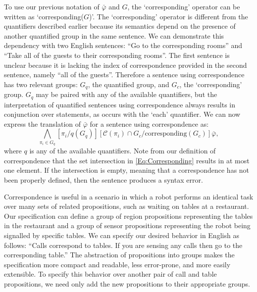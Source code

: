 To use our previous notation of $\bar{\varphi}$ and $G$, the `corresponding' operator can be written as `corresponding($G$)'. 
The `corresponding' operator is different from the quantifiers described earlier because its semantics depend on the presence of another quantified group in the same sentence. 
We can demonstrate this dependency with two English sentences: ``Go to the corresponding rooms'' and ``Take all of the guests to their corresponding rooms''.
The first sentence is unclear because it is lacking the index of correspondence provided in the second sentence, namely ``all of the guests''. 
Therefore a sentence using correspondence has two relevant groups: $G_q$, the quantified group, and $G_c$, the `corresponding' group. 
$G_q$ may be paired with any of the available quantifiers, but the interpretation of quantified sentences using correspondence always results in conjunction over statements, as occurs with the `each' quantifier. 
We can now express the translation of $\bar{\varphi}$ for a sentence using correspondence as:
\begin{equation}\label{Eq:Corresponding}
	\bigwedge \limits_{\pi_i \in G_q} [\pi_i / q(G_q)] [\mathcal{C}(\pi_i) \cap G_c / \text{corresponding}(G_c)] \bar{\varphi},
\end{equation}
where $q$ is any of the available quantifiers. 
Note from our definition of correspondence that the set intersection in \eqref{Eq:Corresponding} results in at most one element. 
If the intersection is empty, meaning that a correspondence has not been properly defined, then the sentence produces a syntax error. 

\begin{myExample}\label{Ex:corresponding}
	Correspondence is useful in a scenario in which a robot performs an identical task over many sets of related propositions, such as waiting on tables at a restaurant. 
	Our specification can define a group of region propositions representing the tables in the restaurant and a group of sensor propositions representing the robot being signalled by specific tables. We can specify our desired behavior in English as follows: 
	``Calls correspond to tables. 
	If you are sensing any calls then go to the corresponding table.''
	The abstraction of propositions into groups makes the specification more compact and readable, less error-prone, and more easily extensible. 
	To specify this behavior over another pair of call and table propositions, we need only add the new propositions to their appropriate groups. 
\end{myExample}
